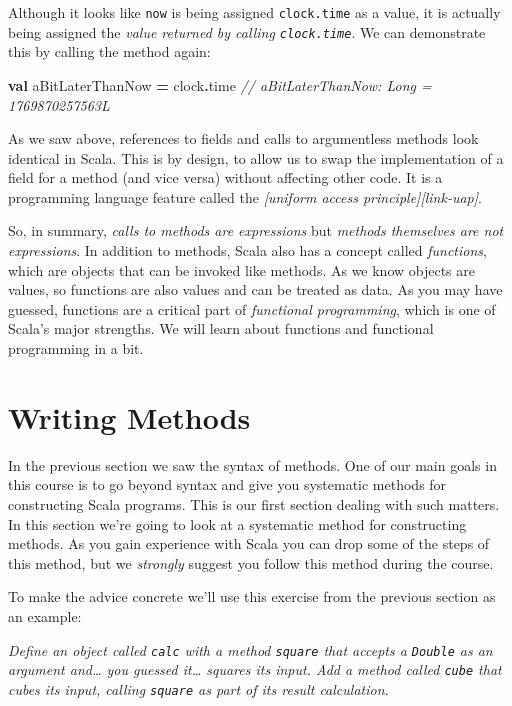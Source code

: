 \documentclass[11pt,a5paper,]{book}
\newenvironment{Shaded}{\begin{snugshade}}{\end{snugshade}}
\newcommand{\CommentTok}[1]{\textcolor[rgb]{0.56,0.35,0.01}{\textit{#1}}}
\newcommand{\KeywordTok}[1]{\textcolor[rgb]{0.13,0.29,0.53}{\textbf{#1}}}
\newcommand{\NormalTok}[1]{#1}
\newcommand{\OperatorTok}[1]{\textcolor[rgb]{0.81,0.36,0.00}{\textbf{#1}}}
\begin{document}
Although it looks like \texttt{now} is being assigned
\texttt{clock.time} as a value, it is actually being assigned the
\emph{value returned by calling \texttt{clock.time}}. We can demonstrate
this by calling the method again:

\begin{Shaded}
\begin{Highlighting}[]
\KeywordTok{val}\NormalTok{ aBitLaterThanNow }\OperatorTok{=}\NormalTok{ clock}\OperatorTok{.}\NormalTok{time}
\CommentTok{// aBitLaterThanNow: Long = 1769870257563L}
\end{Highlighting}
\end{Shaded}

As we saw above, references to fields and calls to argumentless methods
look identical in Scala. This is by design, to allow us to swap the
implementation of a field for a method (and vice versa) without
affecting other code. It is a programming language feature called the
\emph{{[}uniform access principle{]}{[}link-uap{]}}.

So, in summary, \emph{calls to methods are expressions} but
\emph{methods themselves are not expressions}. In addition to methods,
Scala also has a concept called \emph{functions}, which are objects that
can be invoked like methods. As we know objects are values, so functions
are also values and can be treated as data. As you may have guessed,
functions are a critical part of \emph{functional programming}, which is
one of Scala's major strengths. We will learn about functions and
functional programming in a bit.

\hypertarget{writing-methods}{%
\section{Writing Methods}\label{writing-methods}}

In the previous section we saw the syntax of methods. One of our main
goals in this course is to go beyond syntax and give you systematic
methods for constructing Scala programs. This is our first section
dealing with such matters. In this section we're going to look at a
systematic method for constructing methods. As you gain experience with
Scala you can drop some of the steps of this method, but we
\emph{strongly} suggest you follow this method during the course.

To make the advice concrete we'll use this exercise from the previous
section as an example:

\emph{Define an object called \texttt{calc} with a method
\texttt{square} that accepts a \texttt{Double} as an argument
and\ldots{} you guessed it\ldots{} squares its input. Add a method
called \texttt{cube} that cubes its input, calling \texttt{square} as
part of its result calculation.}
\end{document}
